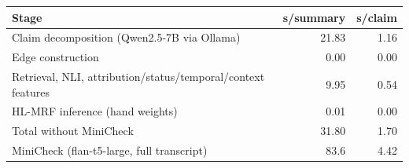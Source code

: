 \begin{tabular}{@{}lrr@{}}
\toprule
Stage & s/summary & s/claim \\
\midrule
Claim decomposition (Qwen2.5-7B via Ollama) & 21.83 & 1.16 \\
Edge construction & 0.00 & 0.00 \\
Retrieval, NLI, attribution/status/temporal/context features & 9.95 & 0.54 \\
HL-MRF inference (hand weights) & 0.01 & 0.00 \\
Total without MiniCheck & 31.80 & 1.70 \\
MiniCheck (flan-t5-large, full transcript) & 83.6 & 4.42 \\
\bottomrule
\end{tabular}